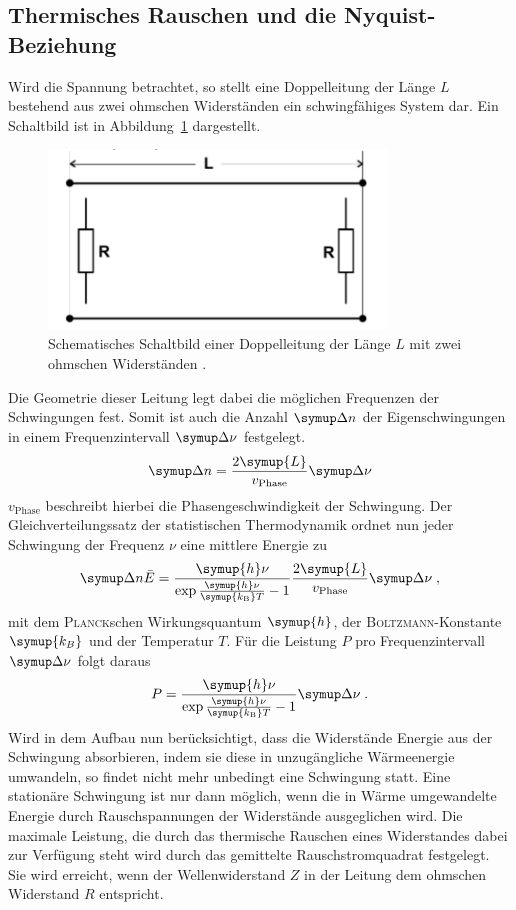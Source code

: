 \subsection{Thermisches Rauschen und die Nyquist-Beziehung}
%
Wird die Spannung betrachtet, so stellt eine Doppelleitung der Länge $L$ bestehend aus zwei ohmschen Widerständen ein schwingfähiges System dar. Ein Schaltbild ist in Abbildung~\ref{fig:doppelleitung} dargestellt.
%
\begin{figure}
  \centering
  \includegraphics[width=0.8\textwidth]{figures/Doppelleitung.pdf}
  \caption{Schematisches Schaltbild einer Doppelleitung der Länge $L$ mit zwei ohmschen Widerständen \cite{V57}.}
  \label{fig:doppelleitung}
\end{figure}
%
Die Geometrie dieser Leitung legt dabei die möglichen Frequenzen der Schwingungen fest. Somit ist auch die Anzahl $\upD n$ der Eigenschwingungen in einem Frequenzintervall $\upD\nu$ festgelegt.
%
\begin{equation}
  \upD n=\frac{2\symup{L}}{v_\text{Phase}}\upD\nu
\end{equation}
%
$v_\text{Phase}$ beschreibt hierbei die Phasengeschwindigkeit der Schwingung. Der Gleichverteilungssatz der statistischen Thermodynamik ordnet nun jeder Schwingung der Frequenz $\nu$ eine mittlere Energie zu
%
\begin{equation}
  \upD n\bar{E}=\frac{\symup{h}\nu}{\exp{\frac{\symup{h}\nu}{\symup{k_\text{B}}T}}-1}\frac{2\symup{L}}{v_\text{Phase}}\upD\nu \; ,
\end{equation}
%
mit dem \textsc{Planck}schen Wirkungsquantum $\symup{h}$, der \textsc{Boltzmann}-Konstante $\symup{k_B}$ und der Temperatur $T$. Für die Leistung $P$ pro Frequenzintervall $\upD\nu$ folgt daraus
%
\begin{equation}
  P=\frac{\symup{h}\nu}{\exp{\frac{\symup{h}\nu}{\symup{k_\text{B}}T}}-1}\upD\nu\; .
\end{equation}
%
Wird in dem Aufbau nun berücksichtigt, dass die Widerstände Energie aus der Schwingung absorbieren, indem sie diese in unzugängliche Wärmeenergie umwandeln, so findet nicht mehr unbedingt eine Schwingung statt. Eine stationäre Schwingung ist nur dann möglich, wenn die in Wärme umgewandelte Energie durch Rauschspannungen der Widerstände ausgeglichen wird. Die maximale Leistung, die durch das thermische Rauschen eines Widerstandes dabei zur Verfügung steht wird durch das gemittelte Rauschstromquadrat festgelegt. Sie wird erreicht, wenn der Wellenwiderstand $Z$ in der Leitung dem ohmschen Widerstand $R$ entspricht.

